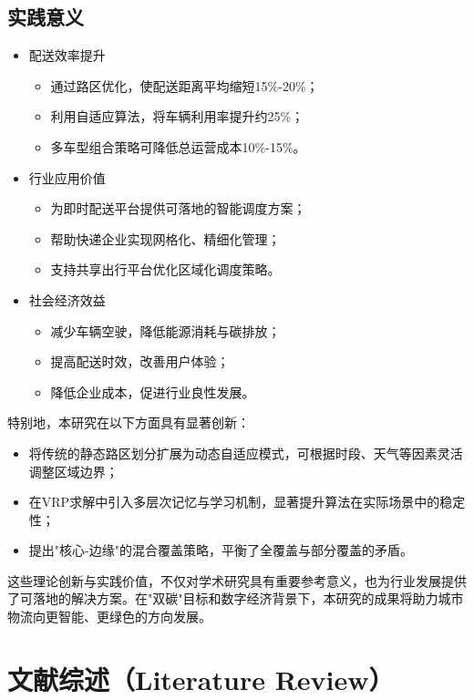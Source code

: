 \documentclass[12pt,a4paper,twoside]{ctexbook}
\begin{document}
\subsection{实践意义}
\begin{itemize}
    \item 配送效率提升
    \begin{itemize}
        \item 通过路区优化，使配送距离平均缩短15\%-20\%；
        \item 利用自适应算法，将车辆利用率提升约25\%；
        \item 多车型组合策略可降低总运营成本10\%-15\%。
    \end{itemize}
    
    \item 行业应用价值
    \begin{itemize}
        \item 为即时配送平台提供可落地的智能调度方案；
        \item 帮助快递企业实现网格化、精细化管理；
        \item 支持共享出行平台优化区域化调度策略。
    \end{itemize}
    
    \item 社会经济效益
    \begin{itemize}
        \item 减少车辆空驶，降低能源消耗与碳排放；
        \item 提高配送时效，改善用户体验；
        \item 降低企业成本，促进行业良性发展。
    \end{itemize}
\end{itemize}

特别地，本研究在以下方面具有显著创新：
\begin{itemize}
    \item 将传统的静态路区划分扩展为动态自适应模式，可根据时段、天气等因素灵活调整区域边界；
    \item 在VRP求解中引入多层次记忆与学习机制，显著提升算法在实际场景中的稳定性；
    \item 提出"核心-边缘"的混合覆盖策略，平衡了全覆盖与部分覆盖的矛盾。
\end{itemize}

这些理论创新与实践价值，不仅对学术研究具有重要参考意义，也为行业发展提供了可落地的解决方案。在"双碳"目标和数字经济背景下，本研究的成果将助力城市物流向更智能、更绿色的方向发展。

\section{文献综述（Literature Review）}
\end{document}
